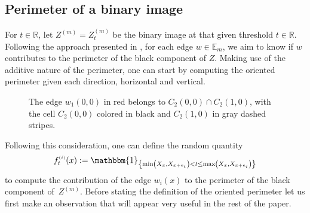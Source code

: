 \documentclass[12pt]{article}
\theoremstyle{Theorem}
\theoremstyle{definition}
\begin{document}
\subsection{Perimeter of a binary image}\label{methods}
For $t \in \mathbb{R}$, let $Z^{\scriptscriptstyle (m)} = Z^{\scriptscriptstyle (m)}_{t}$ be the  binary image at that given threshold $t \in \mathbb{R}$. Following  the approach  presented in \cite{HermineAgnes},  for each edge $w \in \mathbb{E}_{m}$, we aim to know if  $w$ contributes  to the perimeter of the black component of $Z$. Making use of the additive nature of the perimeter, one can start by computing the oriented perimeter given each direction, horizontal and vertical.
\begin{figure}[H]
\begin{center}
\end{center}
\vspace{-0.25cm}
\caption{The edge $w_{1}(0,0)$ in red belongs to $C_{2}(0,0) \cap C_{2}(1, 0)$, with the cell $C_{2}(0,0)$ colored in black and $C_{2}(1, 0)$ in gray dashed stripes.}
\label{fig1}
\end{figure}
\vspace{-0.5cm}
Following this consideration, one can define the random quantity
\begin{equation}
f_{t}^{\scriptscriptstyle (i)}(x) := \mathbbm{1}_{\left\{\min\left(X_{x}, X_{\scriptscriptstyle x +e_{i}}\right) < t \leq \max\left(X_{x}, X_{\scriptscriptstyle x+e_{i}}\right)\right\}}
\label{fi}
\end{equation}
to compute the contribution of the edge $w_i(x)$ to the perimeter of the black component of~$Z^{\scriptscriptstyle (m)}$. Before stating the definition of the oriented perimeter let us first make an observation that will appear very useful in the rest of the paper.  
\end{document}
